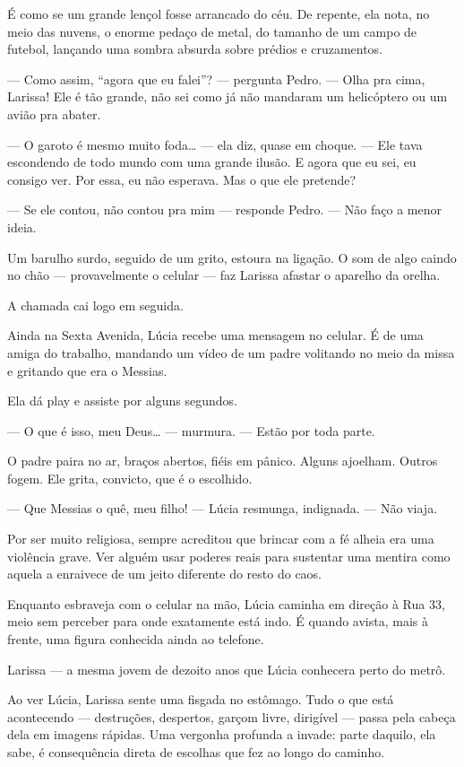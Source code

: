 É como se um grande lençol fosse arrancado do céu.  
De repente, ela nota, no meio das nuvens, o enorme pedaço de metal, do tamanho de um campo de futebol, lançando uma sombra absurda sobre prédios e cruzamentos.

— Como assim, “agora que eu falei”? — pergunta Pedro. — Olha pra cima, Larissa! Ele é tão grande, não sei como já não mandaram um helicóptero ou um avião pra abater.

— O garoto é mesmo muito foda… — ela diz, quase em choque. — Ele tava escondendo de todo mundo com uma grande ilusão.  
E agora que eu sei, eu consigo ver.  
Por essa, eu não esperava.  
Mas o que ele pretende?

— Se ele contou, não contou pra mim — responde Pedro. — Não faço a menor ideia.

Um barulho surdo, seguido de um grito, estoura na ligação.  
O som de algo caindo no chão — provavelmente o celular — faz Larissa afastar o aparelho da orelha.

A chamada cai logo em seguida.

\bigskip

Ainda na Sexta Avenida, Lúcia recebe uma mensagem no celular.  
É de uma amiga do trabalho, mandando um vídeo de um padre volitando no meio da missa e gritando que era o Messias.

Ela dá play e assiste por alguns segundos.

— O que é isso, meu Deus… — murmura. — Estão por toda parte.

O padre paira no ar, braços abertos, fiéis em pânico.  
Alguns ajoelham.  
Outros fogem.  
Ele grita, convicto, que é o escolhido.

— Que Messias o quê, meu filho! — Lúcia resmunga, indignada. — Não viaja.

Por ser muito religiosa, sempre acreditou que brincar com a fé alheia era uma violência grave.  
Ver alguém usar poderes reais para sustentar uma mentira como aquela a enraivece de um jeito diferente do resto do caos.

Enquanto esbraveja com o celular na mão, Lúcia caminha em direção à Rua 33, meio sem perceber para onde exatamente está indo.  
É quando avista, mais à frente, uma figura conhecida ainda ao telefone.

Larissa — a mesma jovem de dezoito anos que Lúcia conhecera perto do metrô.

Ao ver Lúcia, Larissa sente uma fisgada no estômago.  
Tudo o que está acontecendo — destruções, despertos, garçom livre, dirigível — passa pela cabeça dela em imagens rápidas.  
Uma vergonha profunda a invade: parte daquilo, ela sabe, é consequência direta de escolhas que fez ao longo do caminho.

